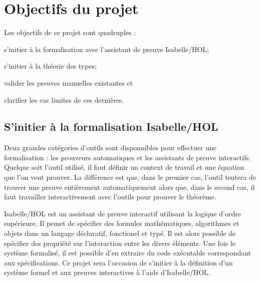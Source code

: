 \documentclass[a4paper, oneside, 12pt, titlepage, draft]{article}
\begin{document}
\section{Objectifs du projet}



Les objectifs de ce projet sont quadruples :
\begin{enumerate*}[label=\arabic*)]
  \item s'initier à la formalisation avec l'assistant de preuve Isabelle/HOL;
  \item s'initier à la théorie des types;
  \item valider les preuves manuelles existantes et
  \item clarifier les cas limites de ces dernières.
\end{enumerate*}

\subsection{S'initier à la formalisation Isabelle/HOL}

Deux grandes catégories d'outils sont disponnibles pour effectuer une formalisation : les prouveurs
automatiques et les assistants de preuve interactifs. Quelque soit l'outil utilisé, il faut définir
un context de travail et une équation que l'on veut prouver. La différence est que, dans le premier
cas, l'outil tentera de trouver une preuve entièrement automatiquement alors que, dans le second
cas, il faut travailler interactivement avec l'outils pour prouver le théorème.

Isabelle/HOL est un assistant de preuve interactif utilisant la logique d'ordre supérieure. Il pemet
de spécifier des formules mathématiques, algorithmes et objets dans un langage déclaratif,
fonctionel et typé. Il est alors possible de spécifier des propriété sur l'interaction entre les
divers éléments. Une fois le système formalisé, il est possible d'en extraire du code exécutable
correspondant aux spécifications. Ce projet sera l'occasion de s'initier à la définition d'un
système formel et aux preuves interactives à l'aide d'Isabelle/HOL.
\end{document}
